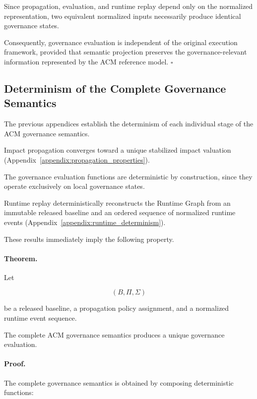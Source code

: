 \documentclass[10pt]{article}
\begin{document}
	Since propagation, evaluation, and runtime replay depend only on the normalized
	representation, two equivalent normalized inputs necessarily produce identical
	governance states.
	
	Consequently, governance evaluation is independent of the original execution
	framework, provided that semantic projection preserves the governance-relevant
	information represented by the ACM reference model.
	\hfill$\square$
	
	\subsection{Determinism of the Complete Governance Semantics}
	\label{appendix:global_determinism}
	
	The previous appendices establish the determinism of each individual stage of
	the ACM governance semantics.
	
	Impact propagation converges toward a unique stabilized impact valuation
	(Appendix~\ref{appendix:propagation_properties}).
	
	The governance evaluation functions are deterministic by construction, since
	they operate exclusively on local governance states.
	
	Runtime replay deterministically reconstructs the Runtime Graph from an
	immutable released baseline and an ordered sequence of normalized runtime events
	(Appendix~\ref{appendix:runtime_determinism}).
	
	These results immediately imply the following property.
	
	\paragraph*{Theorem.}
	
	Let
	
	\[
	(B,\Pi,\Sigma)
	\]
	
	be a released baseline, a propagation policy assignment, and a normalized
	runtime event sequence.
	
	The complete ACM governance semantics produces a unique governance evaluation.
	
	\paragraph*{Proof.}
	
	The complete governance semantics is obtained by composing deterministic
	functions:
	
\end{document}
